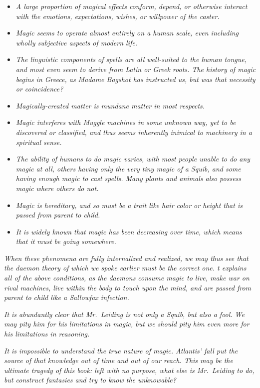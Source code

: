 \begin{itemize}
\tightlist
\item
  \emph{A large proportion of magical effects conform, depend, or
  otherwise interact with the emotions, expectations, wishes, or
  willpower of the caster.}
\item
  \emph{Magic seems to operate almost entirely on a human scale, even
  including wholly subjective aspects of modern life.}
\item
  \emph{The linguistic components of spells are all well-suited to the
  human tongue, and most even seem to derive from Latin or Greek roots.
  The history of magic begins in Greece, as Madame Bagshot has
  instructed us, but was that necessity or coincidence?}
\item
  \emph{Magically-created matter is mundane matter in most respects.}
\item
  \emph{Magic interferes with Muggle machines in some unknown way, yet
  to be discovered or classified, and thus seems inherently inimical to
  machinery in a spiritual sense.}
\item
  \emph{The ability of humans to do magic varies, with most people
  unable to do any magic at all, others having only the very tiny magic
  of a Squib, and some having enough magic to cast spells. Many plants
  and animals also possess magic where others do not.}
\item
  \emph{Magic is hereditary, and so must be a trait like hair color or
  height that is passed from parent to child.}
\item
  \emph{It is widely known that magic has been decreasing over time,
  which means that it must be going somewhere.}
\end{itemize}

\emph{When these phenomena are fully internalized and realized, we may
thus see that the daemon theory of which we spoke earlier must be the
correct one. t explains all of the above conditions, as the daemons
consume magic to live, make war on rival machines, live within the body
to touch upon the mind, and are passed from parent to child like a
Sallowfax infection.}\\


\mybreak

\emph{It is abundantly clear that Mr.~Leiding is not only a Squib, but
also a fool. We may pity him for his limitations in magic, but we should
pity him even more for his limitations in reasoning.}

\emph{It is impossible to understand the true nature of magic. Atlantis'
fall put the source of that knowledge out of time and out of our reach.
This may be the ultimate tragedy of this book: left with no purpose,
what else is Mr.~Leiding to do, but construct fantasies and try to know
the unknowable?}\\

